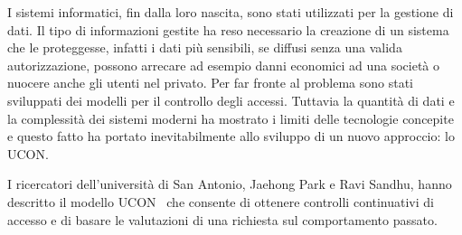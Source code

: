 I sistemi informatici, fin dalla loro nascita, sono stati utilizzati per la gestione di dati.
Il tipo di informazioni gestite ha reso necessario la creazione di un sistema che le proteggesse, infatti i
dati più sensibili, se diffusi senza una valida autorizzazione, possono arrecare ad esempio danni economici
ad una società o nuocere anche gli utenti nel privato.
Per far fronte al problema sono stati sviluppati dei modelli per il controllo degli accessi. Tuttavia la quantità di dati
e la complessità dei sistemi moderni ha mostrato i limiti delle tecnologie concepite e questo fatto ha portato inevitabilmente
allo sviluppo di un nuovo approccio: lo \acl{UCON}.

I ricercatori dell'università di San Antonio, Jaehong Park e Ravi Sandhu, hanno descritto il modello
\ac{UCON}~\cite{ucon} che consente di ottenere controlli continuativi di accesso e di basare le valutazioni di una richiesta
sul comportamento passato.

